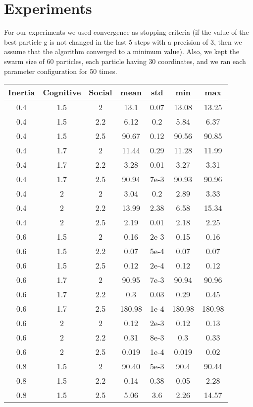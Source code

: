 \documentclass{article}
\begin{document}
\section{Experiments}
For our experiments we used convergence as stopping criteria (if the value of the best particle g is not changed in the last 5 steps with a precision of 3, then we assume that the algorithm converged to a minimum value). Also, we kept the swarm size of 60 particles, each particle having 30 coordinates, and we ran each parameter configuration for 50 times.
\begin{table}[h!]
\centering
\begin{tabular}{ |c|c|c|c|c|c|c| } 
\hline
Inertia & Cognitive & Social & mean & std & min & max\\
\hline
0.4 & 1.5 & 2 & 13.1 & 0.07 & 13.08 & 13.25 \\ 
0.4 & 1.5 & 2.2 & 6.12 & 0.2 & 5.84 & 6.37 \\ 
0.4 & 1.5 & 2.5 & 90.67 & 0.12 & 90.56 & 90.85\\ 
0.4 & 1.7 & 2 & 11.44 & 0.29 & 11.28 & 11.99\\
0.4 & 1.7 & 2.2 & 3.28 & 0.01 & 3.27 & 3.31\\
0.4 & 1.7 & 2.5 & 90.94 & 7e-3 & 90.93 & 90.96\\
0.4 & 2 & 2 & 3.04 & 0.2 & 2.89 & 3.33\\
0.4 & 2 & 2.2 & 13.99 & 2.38 & 6.58 & 15.34\\
0.4 & 2 & 2.5 & 2.19 & 0.01 & 2.18 & 2.25\\
0.6 & 1.5 & 2 & 0.16 & 2e-3 & 0.15 & 0.16\\
0.6 & 1.5 & 2.2 & 0.07 & 5e-4 & 0.07 & 0.07\\ 
0.6 & 1.5 & 2.5 & 0.12 & 2e-4 & 0.12 & 0.12\\ 
0.6 & 1.7 & 2 & 90.95 & 7e-3 & 90.94 & 90.96\\
0.6 & 1.7 & 2.2 & 0.3 & 0.03 & 0.29 & 0.45\\
0.6 & 1.7 & 2.5 & 180.98 & 1e-4 & 180.98 & 180.98\\
0.6 & 2 & 2 & 0.12 & 2e-3 & 0.12 & 0.13\\
0.6 & 2 & 2.2 & 0.31 & 8e-3 & 0.3 & 0.33\\
0.6 & 2 & 2.5 & 0.019 & 1e-4 & 0.019 & 0.02\\
0.8 & 1.5 & 2 & 90.40 & 5e-3 & 90.4 & 90.44\\
0.8 & 1.5 & 2.2 & 0.14 & 0.38 & 0.05 & 2.28\\ 
0.8 & 1.5 & 2.5 & 5.06 & 3.6 & 2.26 & 14.57\\ 

\end{tabular}
\end{table}
\end{document}
